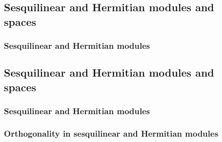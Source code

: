 



\subsection{Sesquilinear and Hermitian modules and spaces}



\subsubsection{Sesquilinear and Hermitian modules}

\subsection{Sesquilinear and Hermitian modules and spaces}

\subsubsection{Sesquilinear and Hermitian modules}







\subsubsection{Orthogonality in sesquilinear and Hermitian modules}







